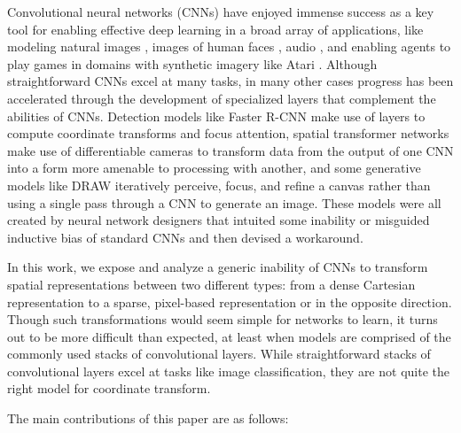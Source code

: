 \documentclass{article}
\begin{document}
Convolutional neural networks (CNNs)
\cite{lecun-1995-convolutional-networks-for-images} have enjoyed
immense success as a key tool for enabling effective deep learning in a
broad array of applications, like modeling natural images
\cite{stack_gan,krizhevsky2012imagenet-classification-with-deep},
images of human faces
\cite{karras-2018-ICLR-progressive-growing-of-gans}, audio
\cite{WaveNet}, and enabling agents to play games in domains with
synthetic imagery like Atari \cite{mnih2013playing-atari-with}.
Although straightforward CNNs excel at many tasks, in many other cases
progress has been accelerated 
through the development of specialized layers that complement the abilities
of CNNs. Detection models like Faster R-CNN \cite{ren-2015-faster-r-cnn:-towards}
make use of layers to compute coordinate transforms and focus attention,
spatial transformer networks \cite{jaderberg:spatial} make use of differentiable cameras
to transform data from the output of one CNN into a form more amenable to processing with another,
and some generative models like DRAW \cite{gregor-2015-draw:-a-recurrent-neural} iteratively
perceive, focus, and refine a canvas rather than using a single pass through a CNN to generate an image.
These models were all created by neural network designers that intuited
some inability or misguided inductive bias of standard CNNs and then
devised a workaround.

In this work, we expose and analyze a generic inability of CNNs
to transform spatial representations between two different types: from a dense Cartesian
representation to a sparse, pixel-based representation or in the opposite direction.
Though such transformations would seem simple for networks to learn, it turns out to be more difficult than expected, at least when models are comprised of the commonly used stacks of convolutional layers. While straightforward stacks of convolutional layers excel at tasks like image classification, they are not quite the right model for coordinate transform.

The main contributions of this paper are as follows:

\end{document}
